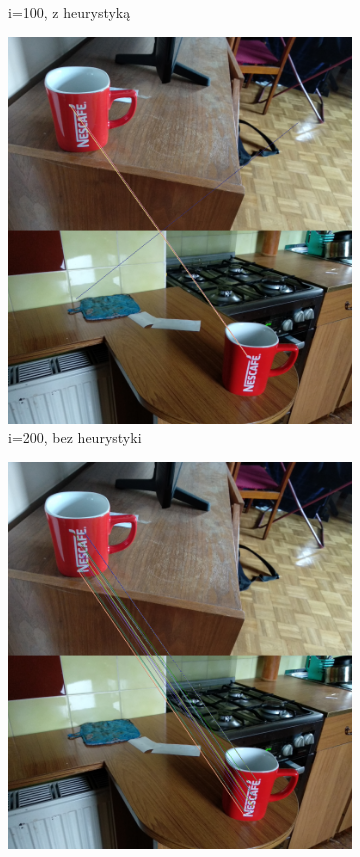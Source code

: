 \documentclass{article}
\begin{document}
\begin{figure}[H]
\begin{subfigure}[b]{0.35\linewidth}
			\caption{i=100, z heurystyką}
		\end{subfigure}
		\begin{subfigure}[b]{0.35\linewidth}
			\includegraphics[width=\linewidth]{200m1.png}
			\caption{i=200, bez heurystyki}
		\end{subfigure}
		\begin{subfigure}[b]{0.35\linewidth}
			\includegraphics[width=\linewidth]{200m2.png}

\end{subfigure}
\end{figure}
\end{document}
